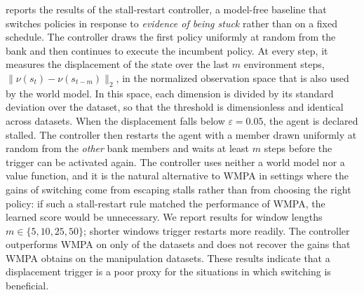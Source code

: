 \documentclass{article}
\theoremstyle{plain}
\theoremstyle{definition}
\theoremstyle{plain}
\newcommand{\wmpa}{\textsc{WMPA}}
\newcommand{\randomswitch}{\textsc{Random-Switch}}
\begin{document}
\begin{table}[htbp]
\caption{\randomswitch{} and \wmpa{} success rate (\%) at the commitment interval they share. Numbers within $95\%$ of the row maximum are in bold.}
\label{tab:random-c}
\centering
\scriptsize
\setlength{\tabcolsep}{3pt}

\end{table}

 reports the results of the stall-restart controller, a model-free baseline that switches policies in response to \emph{evidence of being stuck} rather than on a fixed schedule. The controller draws the first
policy uniformly at random from the bank and then continues to execute the incumbent policy. At every step, it measures the displacement of the state over the last $m$ environment steps, $\|\nu(s_t)-\nu(s_{t-m})\|_2$, in the
normalized observation space that is also used by the world model. In this space, each dimension is divided by its standard deviation over the dataset, so that the threshold is dimensionless and identical across datasets. When
the displacement falls below $\varepsilon=0.05$, the agent is declared stalled. The controller then restarts the agent with a member drawn uniformly at random from the \emph{other} bank members and waits at least
$m$ steps before the trigger can be activated again. The controller uses neither a world model nor a value function, and it is the natural alternative to \wmpa{} in settings where the gains of switching come from
escaping stalls rather than from choosing the right policy: if such a stall-restart rule matched the performance of \wmpa{}, the learned score would be unnecessary. We report results for window lengths
$m\in\{5,10,25,50\}$; shorter windows trigger restarts more readily. The controller outperforms \wmpa{} on only \NumStallBeatsWmpp{} of the \NumEnvsStall{} datasets and does not recover the gains that \wmpa{} obtains
on the manipulation datasets. These results indicate that a displacement trigger is a poor proxy for the situations in which switching is beneficial.
\end{document}
